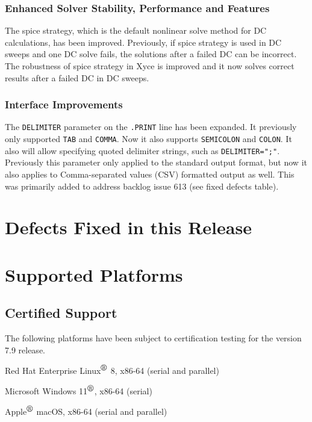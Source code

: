 \documentclass[letterpaper]{scrartcl}
\begin{document}
\subsubsection*{Enhanced Solver Stability, Performance and Features}
\begin{XyceItemize}


\item The spice strategy, which is the default nonlinear solve method for DC 
calculations, has been improved. Previously, if spice strategy is used in
DC sweeps and one DC solve fails, the solutions after a failed DC can 
be incorrect. The robustness of spice strategy in Xyce is improved and it now
solves correct results after a failed DC in DC sweeps. 

\end{XyceItemize}

\subsubsection*{Interface Improvements}
\begin{XyceItemize}
\item The \texttt{DELIMITER} parameter on the \texttt{.PRINT} line has been expanded.  It previously only supported \texttt{TAB} and \texttt{COMMA}.  Now it also supports \texttt{SEMICOLON} and \texttt{COLON}.  It also will allow specifying quoted delimiter strings, such as \texttt{DELIMITER=";"}.  Previously this parameter only applied to the standard output format, but now it also applies to Comma-separated values (CSV) formatted output as well.  This was primarily added to address backlog issue 613 (see fixed defects table).
\end{XyceItemize}

\newpage
\section{Defects Fixed in this Release}


\newpage
\section{Supported Platforms}
\subsection*{Certified Support}
The following platforms have been subject to certification testing for the
\Xyce{} version 7.9 release.
\begin{XyceItemize}
  \item Red Hat Enterprise Linux${}^{\mbox{\textregistered}}$ 8, x86-64 (serial and parallel)
  \item Microsoft Windows 11${}^{\mbox{\textregistered}}$, x86-64 (serial)
  \item Apple${}^{\mbox{\textregistered}}$ macOS, x86-64 (serial and parallel)
\end{XyceItemize}
\end{document}
